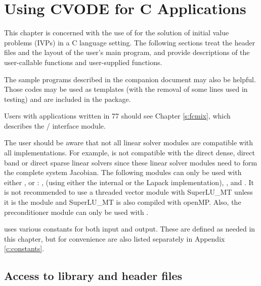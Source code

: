\chapter{Using CVODE for C Applications}\label{s:simulation}

This chapter is concerned with the use of {\cvode} for the solution of
initial value problems (IVPs) in a C language setting.  The following
sections treat the header files and the layout of the user's main
program, and provide descriptions of the {\cvode} user-callable
functions and user-supplied functions.

The sample programs described in the companion document \cite{cvode_ex} 
may also be helpful.  Those codes may be used as templates (with the removal
of some lines used in testing) and are included in the {\cvode} package.

Users with applications written in {\F}77 should see Chapter \ref{s:fcmix},
which describes the {\F}/{\CC} interface module.

The user should be aware that not all linear solver modules are compatible 
with all {\nvector} implementations. 
For example, {\nvecp} is not compatible with the direct dense, direct
band or direct sparse linear solvers since these linear solver modules
need to form the complete 
system Jacobian. The following {\cvode} modules can only be used with
either {\nvecs}, {\nvecopenmp} or {\nvecpthreads}:
{\cvdense}, {\cvband} (using either the internal or the Lapack implementation),
{\cvklu}, {\cvsuperlumt} and {\cvbandpre}. 
It is not recommended to use a threaded vector module with SuperLU\_MT
unless it is the {\nvecopenmp} module and SuperLU\_MT is also compiled
with openMP.
Also, the preconditioner
module {\cvbbdpre} can only be used with {\nvecp}. 

{\cvode} uses various constants for both input and output.  These are
defined as needed in this chapter, but for convenience are also listed
separately in Appendix \ref{c:constants}.

\section{Access to library and header files}\label{ss:file_access}

